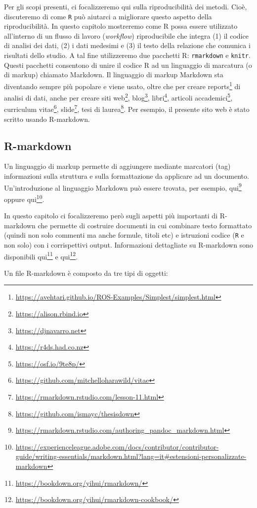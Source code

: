 \documentclass[
  11pt,
]{krantz}
\renewcommand{\href}[2]{#2\footnote{\url{#1}}}
\theoremstyle{definition}
\theoremstyle{definition}
\theoremstyle{definition}
\theoremstyle{definition}
\theoremstyle{remark}
\begin{document}
Per gli scopi presenti, ci focalizzeremo qui sulla riproducibilità dei metodi. Cioè, discuteremo di come \texttt{R} può aiutarci a migliorare questo aspetto della riproducibilità. In questo capitolo mostreremo come R possa essere utilizzato all'interno di un flusso di lavoro (\emph{workflow}) riproducibile che integra (1) il codice di analisi dei dati, (2) i dati medesimi e (3) il testo della relazione che comunica i risultati dello studio. A tal fine utilizzeremo due pacchetti R: \texttt{rmarkdown} e \texttt{knitr}. Questi pacchetti consentono di unire il codice R ad un linguaggio di marcatura (o di markup) chiamato Markdown. Il linguaggio di markup Markdown sta diventando sempre più popolare e viene usato, oltre che per creare \href{https://avehtari.github.io/ROS-Examples/Simplest/simplest.html}{reports} di analisi di dati, anche per creare \href{https://alison.rbind.io}{siti web}, \href{https://djnavarro.net}{blog}, \href{https://r4ds.had.co.nz}{libri}, \href{https://osf.io/9te8p/}{articoli accademici}, \href{https://github.com/mitchelloharawild/vitae}{curriculum vitae}, \href{https://rmarkdown.rstudio.com/lesson-11.html}{slide}, \href{https://github.com/ismayc/thesisdown}{tesi di laurea}. Per esempio, il presente sito web è stato scritto usando R-markdown.

\hypertarget{r-markdown}{%
\subsection{R-markdown}\label{r-markdown}}

Un linguaggio di markup permette di aggiungere mediante marcatori (tag) informazioni sulla struttura e sulla formattazione da applicare ad un documento. Un'introduzione al linguaggio Markdown può essere trovata, per esempio, \href{https://rmarkdown.rstudio.com/authoring_pandoc_markdown.html}{qui} oppure \href{https://experienceleague.adobe.com/docs/contributor/contributor-guide/writing-essentials/markdown.html?lang=it\#estensioni-personalizzate-markdown}{qui}.

In questo capitolo ci focalizzeremo però sugli aspetti più importanti di R-markdown che permette di costruire documenti in cui combinare testo formattato (quindi non solo commenti ma anche formule, titoli etc) e istruzioni codice (\texttt{R} e non solo) con i corrispettivi output. Informazioni dettagliate su R-markdown sono disponibili \href{https://bookdown.org/yihui/rmarkdown/}{qui} e \href{https://bookdown.org/yihui/rmarkdown-cookbook/}{qui}.

Un file R-markdown è composto da tre tipi di oggetti:
\end{document}

